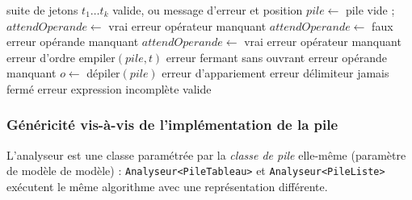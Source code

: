 \documentclass[11pt,a4paper]{article}
\newcommand{\code}[1]{\texttt{#1}}
\begin{document}
\begin{algorithm}[H]
\caption{Vérification d'une expression infixe}
\begin{algorithmic}[1]
\Require suite de jetons $t_1 \dots t_k$
\Ensure valide, ou message d'erreur et position
\State $pile \gets$ pile vide ; $attendOperande \gets$ vrai
     \Return erreur \og opérateur manquant \fg{} \EndIf
    \State $attendOperande \gets$ faux
     \Return erreur \og opérande manquant \fg{} \EndIf
    \State $attendOperande \gets$ vrai
     \Return erreur \og opérateur manquant \fg{} \EndIf
     \Return erreur d'ordre \EndIf
    \State empiler$(pile, t)$
  \Else {}
     \Return erreur \og fermant sans ouvrant \fg{} \EndIf
     \Return erreur \og opérande manquant \fg{} \EndIf
    \State $o \gets$ dépiler$(pile)$
     \Return erreur d'appariement \EndIf
  \EndIf
\EndFor
{} \Return erreur \og délimiteur jamais fermé \fg{} \EndIf
{} \Return erreur \og expression incomplète \fg{} \EndIf
\State \Return valide
\end{algorithmic}
\end{algorithm}

\subsubsection{Généricité vis-à-vis de l'implémentation de la pile}

L'analyseur est une classe paramétrée par la \emph{classe de pile}
elle-même (paramètre de modèle de modèle) : \code{Analyseur<PileTableau>}
et \code{Analyseur<PileListe>} exécutent le même algorithme avec
une représentation différente.
\end{document}
